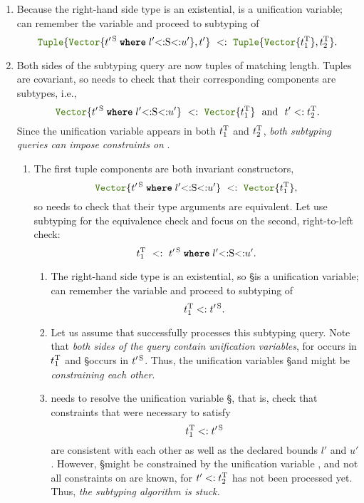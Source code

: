 \begin{enumerate}
  \item Because the right-hand side type is an existential,
    \T is a unification variable; \algo can remember the variable and proceed
    to subtyping of
    \[ 
      \tupletyp{\vectyp{\wheret{\t'^{\,\S}}{l'{<:}\S{<:}u'}}, \t'}
        \ <:\ 
        \tupletyp{\vectyp{\t_1^{\T}}, \t_2^{\T}}. 
    \]
  \item Both sides of the subtyping query are now tuples of matching length.
    Tuples are covariant, so \algo needs to check that their corresponding 
    components are subtypes, i.e.,
    \[ 
      \vectyp{\wheret{\t'^{\,\S}}{l'{<:}\S{<:}u'}}\ <:\ \vectyp{\t_1^{\T}} 
      \ \ \text{and}\ \ \t' <: \t_2^{\T}.
    \]
    Since the unification variable \T appears in both $t_1^{\mathrm{T}}$ and $t_2^{\mathrm{T}}$,
    \emph{both subtyping queries can impose constraints on \T}.
    \begin{enumerate}
      \item The first tuple components are both invariant constructors,
        \[ 
          \vectyp{\wheret{\t'^{\,\S}}{l'{<:}\S{<:}u'}} 
          \ <:\  
          \vectyp{\t_1^{\T}}, 
        \]
        so \algo needs to check that their type arguments are equivalent.
        Let \algo use subtyping for the equivalence check and focus
        on the second, right-to-left check:
        \[ \t_1^{\T}\ <:\ \wheret{\t'^{\,\S}}{l'{<:}\S{<:}u'}. \]
        \begin{enumerate}
          \item The right-hand side type is an existential, so \S is a unification
            variable; \algo can remember the variable and proceed to 
            subtyping of \[ t_1^{\mathrm{T}} <: t'^{\,\mathrm{S}}. \]
          \item Let us assume that \algo successfully processes this subtyping
            query. Note that \emph{both sides of the query contain
            unification variables}, for \T occurs in $t_1^{\mathrm{T}}$
            and \S occurs in $t'^{\,\mathrm{S}}$.
            Thus, the unification variables \S and \T might
            be \emph{constraining each other}.
          \item\label{item:sub-stuck} \algo needs to resolve the unification variable \S, that is,
            check that constraints that were necessary to satisfy 
            \[ t_1^{\mathrm{T}} <: t'^{\,\mathrm{S}} \]
            are consistent with each other as well as the declared bounds
            $l'$ and $u'$.
            However, \S might be constrained by the unification variable \T,
            and not all constraints on \T are known, for $t' <: t_2^{\mathrm{T}}$
            has not been processed yet.
            Thus, \emph{the subtyping algorithm \algo is stuck.}
        \end{enumerate}
    \end{enumerate}
\end{enumerate}

